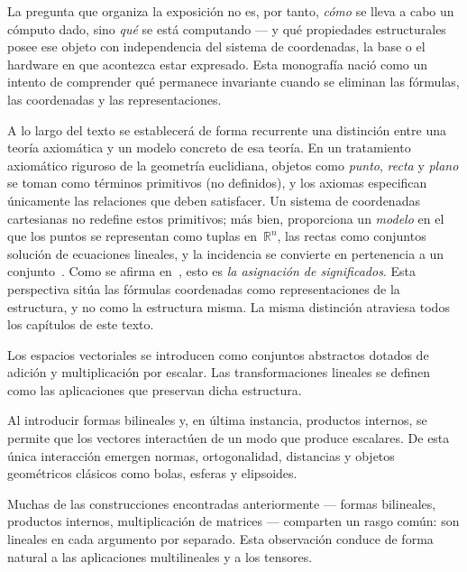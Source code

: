 \documentclass[12pt,openany]{book}
\theoremstyle{definition}
\begin{document}
\medskip

La pregunta que organiza la exposición no es, por tanto, \emph{cómo} se lleva
a cabo un cómputo dado, sino \emph{qué} se está computando --- y qué
propiedades estructurales posee ese objeto con independencia del sistema de
coordenadas, la base o el hardware en que acontezca estar expresado.
Esta monografía nació como un intento de comprender qué permanece invariante
cuando se eliminan las fórmulas, las coordenadas y las representaciones.

\medskip

A lo largo del texto se establecerá de forma recurrente una distinción entre
una teoría axiomática y un modelo concreto de esa teoría.
En un tratamiento axiomático riguroso de la geometría euclidiana, objetos como
\textit{punto}, \textit{recta} y \textit{plano} se toman como términos
primitivos (no definidos), y los axiomas especifican únicamente las relaciones
que deben satisfacer.
Un sistema de coordenadas cartesianas no redefine estos primitivos; más bien,
proporciona un \emph{modelo} en el que los puntos se representan como tuplas
en~$\mathbb{R}^n$, las rectas como conjuntos solución de ecuaciones lineales,
y la incidencia se convierte en pertenencia a un conjunto~\cite{iribarren2}.
Como se afirma en~\cite{wilder}, esto es \textit{la asignación de
significados}.
Esta perspectiva sitúa las fórmulas coordenadas como representaciones de la
estructura, y no como la estructura misma.
La misma distinción atraviesa todos los capítulos de este texto.

\medskip

Los espacios vectoriales se introducen como conjuntos abstractos dotados de
adición y multiplicación por escalar.
Las transformaciones lineales se definen como las aplicaciones que preservan
dicha estructura.

\medskip

Al introducir formas bilineales y, en última instancia, productos internos, se
permite que los vectores interactúen de un modo que produce escalares.
De esta única interacción emergen normas, ortogonalidad, distancias y objetos
geométricos clásicos como bolas, esferas y elipsoides.

\medskip

Muchas de las construcciones encontradas anteriormente --- formas bilineales,
productos internos, multiplicación de matrices --- comparten un rasgo común:
son lineales en cada argumento por separado.
Esta observación conduce de forma natural a las aplicaciones multilineales y a
los tensores.
\end{document}
